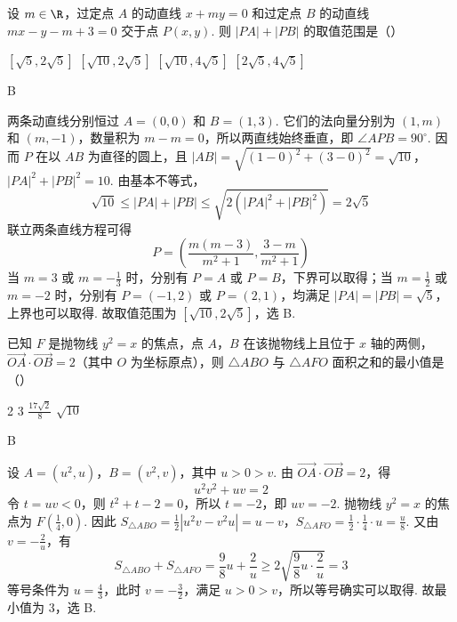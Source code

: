 \begin{problem}
设 \(m \in \R\)，过定点 \(A\) 的动直线 \(x + my = 0\) 和过定点 \(B\) 的动直线 \(mx - y - m + 3 = 0\) 交于点 \(P(x, y)\). 则 \(|PA| + |PB|\) 的取值范围是（\quad）

\choices
    {\([\sqrt{5}, 2\sqrt{5}]\)}
    {\([\sqrt{10}, 2\sqrt{5}]\)}
    {\([\sqrt{10}, 4\sqrt{5}]\)}
    {\([2\sqrt{5}, 4\sqrt{5}]\)}
\begin{answer}
B
\end{answer}

\begin{solution}
两条动直线分别恒过 \(A=(0,0)\) 和 \(B=(1,3)\). 它们的法向量分别为 \((1,m)\) 和 \((m,-1)\)，数量积为 \(m-m=0\)，所以两直线始终垂直，即 \(\angle APB=90^{\circ}\). 因而 \(P\) 在以 \(AB\) 为直径的圆上，且
\(|AB|=\sqrt{(1-0)^2+(3-0)^2}=\sqrt{10}\)，\(|PA|^2+|PB|^2=10\).
由基本不等式，
\[
\sqrt{10}\leqslant |PA|+|PB|\leqslant\sqrt{2\left(|PA|^2+|PB|^2\right)}=2\sqrt5
\]
联立两条直线方程可得
\[
P=\left(\frac{m(m-3)}{m^2+1},\frac{3-m}{m^2+1}\right)
\]
当 \(m=3\) 或 \(m=-\frac13\) 时，分别有 \(P=A\) 或 \(P=B\)，下界可以取得；当 \(m=\frac12\) 或 \(m=-2\) 时，分别有 \(P=(-1,2)\) 或 \(P=(2,1)\)，均满足 \(|PA|=|PB|=\sqrt5\)，上界也可以取得. 故取值范围为 \([\sqrt{10},2\sqrt5]\)，选 B.
\end{solution}
\end{problem}

\begin{problem}
已知 \(F\) 是抛物线 \(y^{2} = x\) 的焦点，点 \(A\)，\(B\) 在该抛物线上且位于 \(x\) 轴的两侧， \(\overrightarrow{OA} \cdot \overrightarrow{OB} = 2\)（其中 \(O\) 为坐标原点），则 \(\triangle ABO\) 与 \(\triangle AFO\) 面积之和的最小值是（\quad）

\choices
    {2}
    {3}
    {\(\frac{17\sqrt{2}}{8}\)}
    {\(\sqrt{10}\)}
\begin{answer}
B
\end{answer}

\begin{solution}
设 \(A=(u^2,u)\)，\(B=(v^2,v)\)，其中 \(u>0>v\). 由 \(\overrightarrow{OA}\cdot\overrightarrow{OB}=2\)，得
\[
u^2v^2+uv=2
\]
令 \(t=uv<0\)，则 \(t^2+t-2=0\)，所以 \(t=-2\)，即 \(uv=-2\). 抛物线 \(y^2=x\) 的焦点为 \(F\left(\frac14,0\right)\). 因此
\(S_{\triangle ABO}=\frac12|u^2v-v^2u|=u-v\)，\(S_{\triangle AFO}=\frac12\cdot\frac14\cdot u=\frac{u}{8}\).
又由 \(v=-\frac2u\)，有
\[
S_{\triangle ABO}+S_{\triangle AFO}=\frac98u+\frac2u\geqslant2\sqrt{\frac98u\cdot\frac2u}=3
\]
等号条件为 \(u=\frac43\)，此时 \(v=-\frac32\)，满足 \(u>0>v\)，所以等号确实可以取得. 故最小值为 \(3\)，选 B.
\end{solution}
\end{problem}

